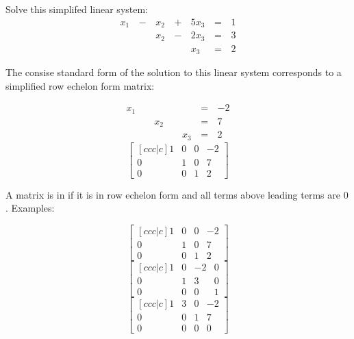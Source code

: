 \begin{applicationActivities}{2}{5}
\begin{activity}{10}
  Solve this simplifed linear system:
    \begin{alignat*}{4}
       x_1 &\,-\,&  x_2  &\,+\,&  5x_3 &\,=\,& 1 \\
           &\, \,&  x_2 &\,-\,&  2x_3 &\,=\,& 3 \\
           &\, \,&      &\, \,&   x_3 &\,=\,& 2
    \end{alignat*}
\end{activity}

\begin{observation}
  The consise standard form of the solution to this linear system
  corresponds to a simplified row echelon form matrix:
  \begin{multicols}{2}\noindent
    \begin{alignat*}{4}
       x_1 &\, \,&      &\, \,&       &\,=\,& -2 \\
           &\, \,&  x_2 &\, \,&       &\,=\,& 7 \\
           &\, \,&      &\, \,&   x_3 &\,=\,& 2
    \end{alignat*}
    \[
      \begin{bmatrix}[ccc|c]
        1 & 0 & 0 & -2 \\
        0 & 1 & 0 & 7 \\
        0 & 0 & 1 & 2
      \end{bmatrix}
    \]
  \end{multicols}
\end{observation}

\begin{definition}
  A matrix is in  if it is in row echelon form
  and all terms above leading terms are \(0\). Examples:
  \begin{multicols}{3}\noindent
    \[
      \begin{bmatrix}[ccc|c]
        1 & 0 & 0 & -2 \\
        0 & 1 & 0 & 7 \\
        0 & 0 & 1 & 2
      \end{bmatrix}
    \]
    \[
      \begin{bmatrix}[ccc|c]
        1 & 0 & -2 & 0 \\
        0 & 1 & 3 & 0 \\
        0 & 0 & 0 & 1
      \end{bmatrix}
    \]
    \[
      \begin{bmatrix}[ccc|c]
        1 & 3 & 0 & -2 \\
        0 & 0 & 1 & 7 \\
        0 & 0 & 0 & 0
      \end{bmatrix}
    \]
  \end{multicols}
\end{definition}


\end{applicationActivities}
